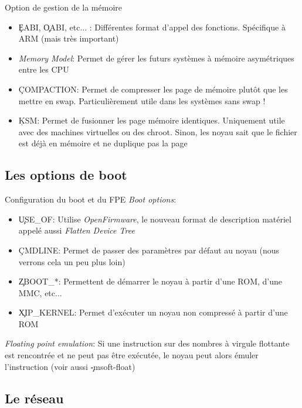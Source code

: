 \begin{frame}[fragile=singleslide]{Option de gestion de la mémoire}
  \begin{itemize} 
  \item \c{EABI},  \c{OABI}, etc...  : Différentes format  d'appel des
    fonctions. Spécifique à ARM (mais très important)
  \item  \emph{Memory Model}: Permet  de gérer  les futurs  systèmes à
    mémoire asymétriques entre les CPU
  \item  \c{COMPACTION}:  Permet de  compresser  les  page de  mémoire
    plutôt  que les mettre  en swap.  Particulièrement utile  dans les
    systèmes sans swap !
  \item  \c{KSM}: Permet  de  fusionner les  page mémoire  identiques.
    Uniquement   utile   avec   des   machines   virtuelles   ou   des
    chroot. Sinon, les  noyau sait que le fichier  est déjà en mémoire
    et ne duplique pas la page
  \end{itemize} 
\end{frame}

\subsection{Les options de boot}

\begin{frame}[fragile=singleslide]{Configuration du boot et du FPE}
  \emph{Boot options}:
  \begin{itemize}
  \item \c{USE_OF}: Utilise  \emph{OpenFirmware}, le nouveau format de
    description matériel appelé aussi \emph{Flatten Device Tree}
  \item  \c{CMDLINE}: Permet de  passer des  paramètres par  défaut au
    noyau (nous verrons cela un peu plus loin)
  \item \c{ZBOOT_*}:  Permettent de démarrer  le noyau à  partir d'une
    ROM, d'une MMC, etc...
  \item  \c{XIP_KERNEL}: Permet  d'exécuter un  noyau non  compressé à
    partir d'une ROM
  \end{itemize}
  \emph{Floating point emulation}: Si  une instruction sur des nombres
  à virgule flottante est rencontrée  et ne peut pas être exécutée, le
  noyau peut alors émuler l'instruction (voir aussi \c{-msoft-float})
\end{frame}

\subsection{Le réseau}

